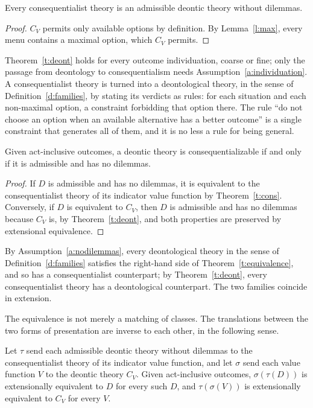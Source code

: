 \documentclass{situationist-preprint}
\begin{document}
\begin{theorem}\label{t:deont}
Every consequentialist theory is an admissible deontic theory without dilemmas.
\end{theorem}

\begin{proof}
$C_V$ permits only available options by definition. By Lemma~\ref{l:max}, every menu contains a maximal option, which $C_V$ permits.
\end{proof}

Theorem~\ref{t:deont} holds for every outcome individuation, coarse or fine; only the passage from deontology to consequentialism needs Assumption~\ref{a:individuation}. A consequentialist theory is turned into a deontological theory, in the sense of Definition~\ref{d:families}, by stating its verdicts as rules: for each situation and each non-maximal option, a constraint forbidding that option there. The rule ``do not choose an option when an available alternative has a better outcome'' is a single constraint that generates all of them, and it is no less a rule for being general.

\begin{theorem}\label{t:equivalence}
Given act-inclusive outcomes, a deontic theory is consequentializable if and only if it is admissible and has no dilemmas.
\end{theorem}

\begin{proof}
If $D$ is admissible and has no dilemmas, it is equivalent to the consequentialist theory of its indicator value function by Theorem~\ref{t:cons}. Conversely, if $D$ is equivalent to $C_V$, then $D$ is admissible and has no dilemmas because $C_V$ is, by Theorem~\ref{t:deont}, and both properties are preserved by extensional equivalence.
\end{proof}

By Assumption~\ref{a:nodilemmas}, every deontological theory in the sense of Definition~\ref{d:families} satisfies the right-hand side of Theorem~\ref{t:equivalence}, and so has a consequentialist counterpart; by Theorem~\ref{t:deont}, every consequentialist theory has a deontological counterpart. The two families coincide in extension.

The equivalence is not merely a matching of classes. The translations between the two forms of presentation are inverse to each other, in the following sense.

\begin{corollary}\label{c:variants}
Let $\tau$ send each admissible deontic theory without dilemmas to the consequentialist theory of its indicator value function, and let $\sigma$ send each value function $V$ to the deontic theory $C_V$. Given act-inclusive outcomes, $\sigma(\tau(D))$ is extensionally equivalent to $D$ for every such $D$, and $\tau(\sigma(V))$ is extensionally equivalent to $C_V$ for every $V$.
\end{corollary}
\end{document}
